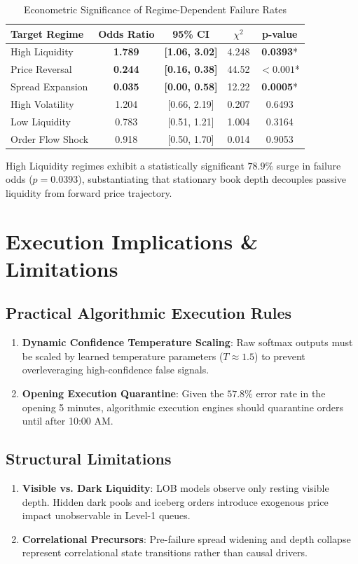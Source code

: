 \documentclass[10pt,twocolumn,letterpaper]{article}
\begin{document}
\begin{table}[h]
\centering
\caption{Econometric Significance of Regime-Dependent Failure Rates}
\label{tab:significance}
\small
\begin{tabular}{lcccc}
\toprule
\textbf{Target Regime} & \textbf{Odds Ratio} & \textbf{95\% CI} & \textbf{$\chi^2$} & \textbf{p-value} \\
\midrule
High Liquidity   & \textbf{1.789} & \textbf{[1.06, 3.02]} & 4.248 & \textbf{0.0393}* \\
Price Reversal   & \textbf{0.244} & \textbf{[0.16, 0.38]} & 44.52 & \textbf{$< 0.001$}* \\
Spread Expansion & \textbf{0.035} & \textbf{[0.00, 0.58]} & 12.22 & \textbf{0.0005}* \\
High Volatility  & 1.204 & [0.66, 2.19] & 0.207 & 0.6493 \\
Low Liquidity    & 0.783 & [0.51, 1.21] & 1.004 & 0.3164 \\
Order Flow Shock & 0.918 & [0.50, 1.70] & 0.014 & 0.9053 \\
\bottomrule
\end{tabular}
\end{table}

High Liquidity regimes exhibit a statistically significant $78.9\%$ surge in failure odds ($p = 0.0393$), substantiating that stationary book depth decouples passive liquidity from forward price trajectory.

\section{Execution Implications & Limitations}
\subsection{Practical Algorithmic Execution Rules}
\begin{enumerate}
    \item \textbf{Dynamic Confidence Temperature Scaling}: Raw softmax outputs must be scaled by learned temperature parameters ($T \approx 1.5$) to prevent overleveraging high-confidence false signals.
    \item \textbf{Opening Execution Quarantine}: Given the $57.8\%$ error rate in the opening 5 minutes, algorithmic execution engines should quarantine orders until after 10:00 AM.
\end{enumerate}

\subsection{Structural Limitations}
\begin{enumerate}
    \item \textbf{Visible vs. Dark Liquidity}: LOB models observe only resting visible depth. Hidden dark pools and iceberg orders introduce exogenous price impact unobservable in Level-1 queues.
    \item \textbf{Correlational Precursors}: Pre-failure spread widening and depth collapse represent correlational state transitions rather than causal drivers.
\end{enumerate}
\end{document}
